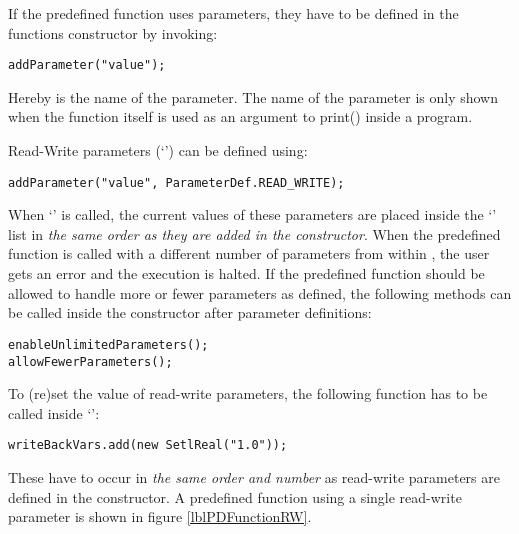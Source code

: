 
If the predefined function uses parameters, they have to be defined in the functions constructor by invoking:
\begin{lstlisting}[frame=none,numbers=none]
addParameter("value");
\end{lstlisting}

Hereby  is the name of the parameter. The name of the parameter is only shown when the function itself is used as an argument to print() inside a \SetlX{} program.

Read-Write parameters (`') can be defined using:
\begin{lstlisting}[frame=none,numbers=none]
addParameter("value", ParameterDef.READ_WRITE);
\end{lstlisting}

When `' is called, the current values of these parameters are placed inside the `' list in \emph{the same order as they are added in the constructor}. When the predefined function is called with a different number of parameters from within \SetlX{}, the user gets an error and the execution is halted. If the predefined function should be allowed to handle more or fewer parameters as defined, the following methods can be called inside the constructor after parameter definitions:
\begin{lstlisting}[frame=none,numbers=none]
enableUnlimitedParameters();
allowFewerParameters();
\end{lstlisting}

To (re)set the value of read-write parameters, the following function has to be called inside `':
\begin{lstlisting}[frame=none,numbers=none]
writeBackVars.add(new SetlReal("1.0"));
\end{lstlisting}

These have to occur in \emph{the same order and number} as read-write parameters are defined in the constructor. A predefined function using a single read-write parameter is shown in figure \ref{lblPDFunctionRW}.



